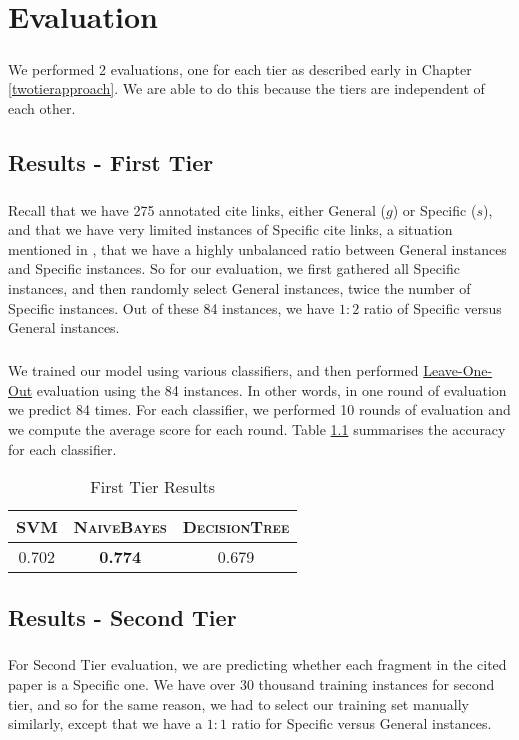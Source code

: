 \chapter{Evaluation}
\label{evaluation}
\paragraph{}
We performed 2 evaluations, one for each tier as described early in Chapter \ref{twotierapproach}. We are able to do this because the tiers are independent of each other.

\section{Results - First Tier}
\paragraph{}
Recall that we have 275 annotated cite links, either General ($g$) or Specific ($s$), and that we have very limited instances of Specific cite links, a situation mentioned in \cite{li2010negative}, that we have a highly unbalanced ratio between General instances and Specific instances. So for our evaluation, we first gathered all Specific instances, and then randomly select General instances, twice the number of Specific instances. Out of these 84 instances, we have $1:2$ ratio of Specific versus General instances.

\paragraph{}
We trained our model using various classifiers, and then performed \url{Leave-One-Out} evaluation using the 84 instances. In other words, in one round of evaluation we predict 84 times. For each classifier, we performed 10 rounds of evaluation and we compute the average score for each round. Table \ref{tab:firsttieresults} summarises the accuracy for each classifier.

\begin{table}[h]
	\center
	\begin{tabular}{ c  c  c }
		\textsc{SVM} & \textsc{NaiveBayes} & \textsc{DecisionTree} \\
		\hline
		0.702 & \textbf{0.774} & 0.679
	\end{tabular}
	\caption{First Tier Results}
	\label{tab:firsttieresults}
\end{table}

\section{Results - Second Tier}
\paragraph{}
For Second Tier evaluation, we are predicting whether each fragment in the cited paper is a Specific one. We have over 30 thousand training instances for second tier, and so for the same reason, we had to select our training set manually similarly, except that we have a $1:1$ ratio for Specific versus General instances.
